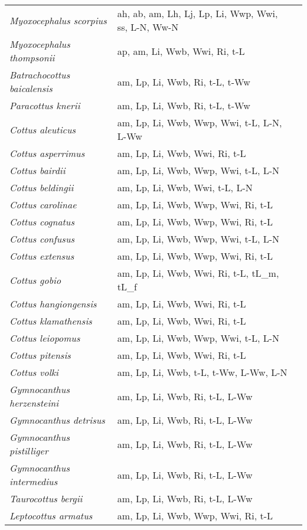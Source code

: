 {\begin{longtable}[c]{p{3.5cm}p{5.5cm}p{5.5cm}}
\emph{Myoxocephalus scorpius} &  ah, ab, am, Lh, Lj, Lp, Li, Wwp, Wwi, ss, L-N, Ww-N & \citet{LuksPede2004} \\
\emph{Myoxocephalus thompsonii} &  ap, am, Li, Wwb, Wwi, Ri, t-L & \citet{GeffNash1992} \\
\emph{Batrachocottus baicalensis} &  am, Lp, Li, Wwb, Ri, t-L, t-Ww & \citet{TolmGavr2008} \\
\emph{Paracottus knerii} &  am, Lp, Li, Wwb, Ri, t-L, t-Ww & \citet{TolmBogd2010} \\
\emph{Cottus aleuticus} &  am, Lp, Li, Wwb, Wwp, Wwi, t-L, L-N, L-Ww & \citet{Patt1971,Gree1966} \\
\emph{Cottus asperrimus} &  am, Lp, Li, Wwb, Wwi, Ri, t-L & \citet{Dani1987} \\
\emph{Cottus bairdii} &  am, Lp, Li, Wwb, Wwp, Wwi, t-L, L-N & \citet{Bail1952,Patt1971} \\
\emph{Cottus beldingii} &  am, Lp, Li, Wwb, Wwi, t-L, L-N & \citet{EberSumm1969,Patt1971} \\
\emph{Cottus carolinae} &  am, Lp, Li, Wwb, Wwp, Wwi, Ri, t-L & \citet{GebhPerk2017} \\
\emph{Cottus cognatus} &  am, Lp, Li, Wwb, Wwp, Wwi, Ri, t-L & \citet{BondJone2016} \\
\emph{Cottus confusus} &  am, Lp, Li, Wwb, Wwp, Wwi, t-L, L-N & \citet{HughPede1984,Patt1971} \\
\emph{Cottus extensus} &  am, Lp, Li, Wwb, Wwp, Wwi, Ri, t-L & \citet{RuzyWurt1998} \\
\emph{Cottus gobio} &  am, Lp, Li, Wwb, Wwi, Ri, t-L, tL\_m, tL\_f & \citet{Pete2009} \\
\emph{Cottus hangiongensis} &  am, Lp, Li, Wwb, Wwi, Ri, t-L & \citet{Goto1989} \\
\emph{Cottus klamathensis} &  am, Lp, Li, Wwb, Wwi, Ri, t-L & \citet{Dani1987} \\
\emph{Cottus leiopomus} &  am, Lp, Li, Wwb, Wwp, Wwi, t-L, L-N & \citet{MeyeCass2008} \\
\emph{Cottus pitensis} &  am, Lp, Li, Wwb, Wwi, Ri, t-L & \citet{Dani1987} \\
\emph{Cottus volki} &  am, Lp, Li, Wwb, t-L, t-Ww, L-Ww, L-N & \citet{Kolp2011} \\
\emph{Gymnocanthus herzensteini} &  am, Lp, Li, Wwb, Ri, t-L, L-Ww & \citet{Panc2010} \\
\emph{Gymnocanthus detrisus} &  am, Lp, Li, Wwb, Ri, t-L, L-Ww & \citet{Panc2012,Panc2010} \\
\emph{Gymnocanthus pistilliger} &  am, Lp, Li, Wwb, Ri, t-L, L-Ww & \citet{Panc2012} \\
\emph{Gymnocanthus intermedius} &  am, Lp, Li, Wwb, Ri, t-L, L-Ww & \citet{Panc2012} \\
\emph{Taurocottus bergii} &  am, Lp, Li, Wwb, Ri, t-L, L-Ww & \citet{PancPush2015} \\
\emph{Leptocottus armatus} &  am, Lp, Li, Wwb, Wwp, Wwi, Ri, t-L & \citet{Weis1962} \\
\hline
\end{longtable}}
